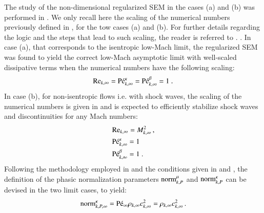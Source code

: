 \documentclass[preprint,10pt]{elsarticle}
\begin{document}
The study of the non-dimensional regularized SEM in the cases (a) and (b) was performed in \cite{Marco_paper_sem}. We only recall here the scaling of the numerical numbers previously defined in , for the tow cases (a) and (b). For further details regarding the logic and the steps that lead to such scaling, the reader is referred to \cite{Marco_paper_sem}.  . 
In case (a), that corresponds to the isentropic low-Mach limit, the regularized SEM was found to yield the correct 
low-Mach asymptotic limit with well-scaled dissipative terms when the numerical numbers have the following scaling:
%
\begin{equation}\label{eq:isent-flow-num-nb}
\textrm{Re}_{k,\infty} = \textrm{P\'e}_{k,\infty}^\kappa = \textrm{P\'e}_{k,\infty}^\beta =1 \ .
\end{equation}
%
In case (b), for non-isentropic flows i.e. with shock waves, the scaling of the numerical numbers is given in  and is expected to efficiently 
stabilize shock waves and discontinuities for any Mach numbers:
%
\begin{align}\label{eq:non-isent-flow-num-nb}
&\Re_{k,\infty} = M_{k,\infty}^2 \,, \nonumber \\ 
& \Pe_{k,\infty}^\kappa = 
1 \\ %
&\Pe_{k,\infty}^\beta = 1 \ . \nonumber
\end{align}
 
Following the methodology employed in \cite{DelchiniCompFluid2014-euler} and the conditions given in  and , the definition of the 
phasic normalization parameters $\textrm{norm}_{k,P}^\mu$ and $\textrm{norm}_{k,P}^\kappa$ can be devised in the two limit cases, to yield:
%
\begin{equation}
\label{eq:norm_relation_bis}
\textrm{norm}_{k,P,\infty}^{\kappa} = \textrm{P\'e}_\infty \rho_{k,\infty} c_{k,\infty}^2 = \rho_{k,\infty} c_{k,\infty}^2 \, .
\end{equation}
\end{document}
